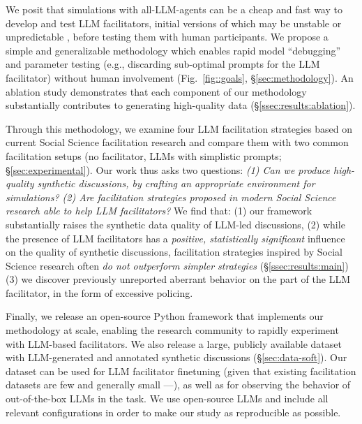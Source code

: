 We posit that simulations with all-LLM-agents can be a cheap and fast way to develop and test  LLM facilitators, initial versions of which may be unstable or unpredictable \cite{atil_2025, rossi_2024}, before testing them with human participants. We propose a simple and generalizable methodology which enables rapid model “debugging” and parameter testing (e.g., discarding sub-optimal  prompts for the LLM facilitator) without human involvement (Fig.~\ref{fig::goals}, \S\ref{sec:methodology}). An ablation study demonstrates that each component of our methodology substantially contributes to generating high-quality data (\S\ref{ssec:results:ablation}). 

Through this methodology, we examine  four LLM facilitation strategies based on current Social Science facilitation research and compare them with two common facilitation setups (no facilitator, LLMs with simplistic prompts; \S\ref{sec:experimental}). Our work thus asks two questions: \emph{(1) Can we produce high-quality synthetic discussions, by crafting an appropriate environment for simulations? (2) Are facilitation strategies proposed in modern Social Science research able to help LLM facilitators?} We find that: (1) our framework substantially raises the synthetic data quality of LLM-led discussions, (2) while the presence of LLM facilitators has a \emph{positive, statistically significant} influence on the quality of synthetic discussions, facilitation strategies inspired by Social Science research often \emph{do not outperform simpler strategies} (\S\ref{ssec:results:main}) (3) we discover previously unreported aberrant behavior on the part of the LLM facilitator, in the form of excessive policing.

Finally, we release an open-source Python framework that implements our methodology at scale, enabling the research community to rapidly experiment with LLM-based facilitators. We also release \vmd a large, publicly available dataset with LLM-generated and annotated synthetic discussions (\S\ref{sec:data-soft}). Our dataset can be used for LLM facilitator finetuning \cite{ulmer2024} (given that existing facilitation datasets are few and generally small ---\citet{korre2025evaluation}), as well as for observing the behavior of out-of-the-box LLMs in the task. We use open-source LLMs and include all relevant configurations in order to make our study as reproducible as possible.
